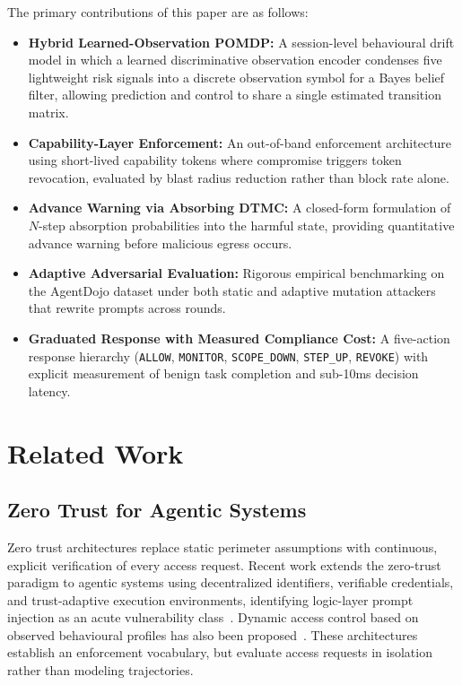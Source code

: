 \documentclass[conference]{IEEEtran}
\begin{document}
The primary contributions of this paper are as follows:
\begin{itemize}
    \item \textbf{Hybrid Learned-Observation POMDP:} A session-level behavioural drift model in which a learned discriminative observation encoder condenses five lightweight risk signals into a discrete observation symbol for a Bayes belief filter, allowing prediction and control to share a single estimated transition matrix.
    \item \textbf{Capability-Layer Enforcement:} An out-of-band enforcement architecture using short-lived capability tokens where compromise triggers token revocation, evaluated by blast radius reduction rather than block rate alone.
    \item \textbf{Advance Warning via Absorbing DTMC:} A closed-form formulation of $N$-step absorption probabilities into the harmful state, providing quantitative advance warning before malicious egress occurs.
    \item \textbf{Adaptive Adversarial Evaluation:} Rigorous empirical benchmarking on the AgentDojo dataset under both static and adaptive mutation attackers that rewrite prompts across rounds.
    \item \textbf{Graduated Response with Measured Compliance Cost:} A five-action response hierarchy (\texttt{ALLOW}, \texttt{MONITOR}, \texttt{SCOPE\_DOWN}, \texttt{STEP\_UP}, \texttt{REVOKE}) with explicit measurement of benign task completion and sub-10ms decision latency.
\end{itemize}

\section{Related Work}

\subsection{Zero Trust for Agentic Systems}
Zero trust architectures replace static perimeter assumptions with continuous, explicit verification of every access request. Recent work extends the zero-trust paradigm to agentic systems using decentralized identifiers, verifiable credentials, and trust-adaptive execution environments, identifying logic-layer prompt injection as an acute vulnerability class~\cite{huang2025fortifying}. Dynamic access control based on observed behavioural profiles has also been proposed~\cite{yao2020dynamic,sharma2021behavioral}. These architectures establish an enforcement vocabulary, but evaluate access requests in isolation rather than modeling trajectories.
\end{document}
